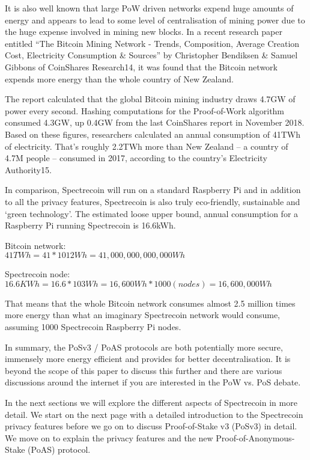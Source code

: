 It is also well known that large PoW driven networks expend huge amounts of
energy and appears to lead to some level of centralisation of mining power
due to the huge expense involved in mining new blocks. In a recent research
paper entitled “The Bitcoin Mining Network - Trends, Composition, Average
Creation Cost, Electricity Consumption \& Sources” by Christopher Bendiksen
\& Samuel Gibbons of CoinShares Research14, it was found that the Bitcoin
network expends more energy than the whole country of New Zealand.



The report calculated that the global Bitcoin mining industry draws 4.7GW of
power every second. Hashing computations for the Proof-of-Work algorithm
consumed 4.3GW, up 0.4GW from the last CoinShares report in November 2018.
Based on these figures, researchers calculated an annual consumption of
41TWh of electricity. That’s roughly 2.2TWh more than New Zealand – a country
of 4.7M people – consumed in 2017, according to the country’s Electricity
Authority15.



In comparison, Spectrecoin will run on a standard Raspberry Pi and in addition
to all the privacy features, Spectrecoin is also truly eco-friendly, sustainable
and ‘green technology’. The estimated loose upper bound, annual consumption for
a Raspberry Pi running Spectrecoin is 16.6kWh.

\vspace{5mm} %

Bitcoin network:\\
$41 TWh = 41*1012 Wh = 41,000,000,000,000 Wh$

\vspace{5mm} %

Spectrecoin node:\\
$16.6 KWh = 16.6 * 103 Wh = 16,600 Wh * 1000 (nodes) = 16,600,000 Wh$

\vspace{5mm} %

That means that the whole Bitcoin network consumes almost 2.5 million times
more energy than what an imaginary Spectrecoin network would consume, assuming
1000 Spectrecoin Raspberry Pi nodes.




In summary, the PoSv3 / PoAS protocols are both potentially more secure,
immensely more energy efficient and provides for better decentralisation.
It is beyond the scope of this paper to discuss this further and there are
various discussions around the internet if you are interested in the PoW vs.
PoS debate.



In the next sections we will explore the different aspects of Spectrecoin in
more detail. We start on the next page with a detailed introduction to the
Spectrecoin privacy features before we go on to discuss Proof-of-Stake v3
(PoSv3) in detail. We move on to explain the privacy features and the new
Proof-of-Anonymous-Stake (PoAS) protocol.